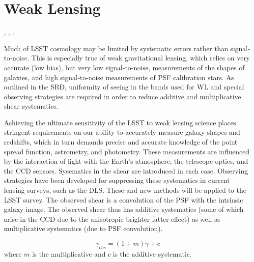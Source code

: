 %
%

\section{Weak Lensing}
\def\secname{wl}\label{sec:\secname}

,
,
.

Much of LSST cosmology may be limited by systematic errors rather than
signal-to-noise. This is especially true of weak gravitational lensing,  which
relies on very accurate (\ie low bias), but very low signal-to-noise,
measurements of the shapes of galaxies, and high signal-to-noise measurements of
PSF calibration stars. As outlined in the SRD, uniformity of seeing in the bands
used for WL and special observing strategies are required in order to reduce
additive and multiplicative shear systematics.

Achieving the ultimate sensitivity of the LSST to weak lensing science places
stringent requirements on our ability to accurately measure galaxy shapes and
redshifts, which in turn demands precise and accurate knowledge of the point
spread function, astrometry, and photometry. These measurements are influenced
by the interaction of light with the Earth's atmosphere, the telescope optics,
and the CCD sensors. Sysematics in the shear are introduced in each case.
Observing strategies have been developed for suppressing these systematics in
current lensing surveys, such as the DLS. These and new methods will be applied
to the LSST survey.  The observed shear is a convolution of the PSF with the
intrinsic galaxy image.  The observed shear thus has additive systematics (some
of which arise in the CCD due to the anisotropic brighter-fatter effect) as well
as multiplicative systematics (due to PSF convolution).

$$ \gamma_{obs} = (1+m) \gamma + c  $$ where $m$ is the multiplicative and $c$
is the additive systematic.

